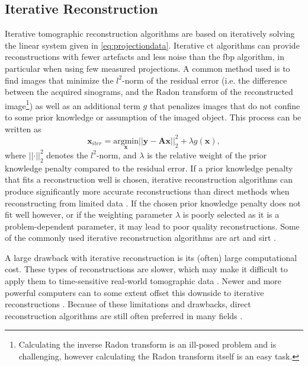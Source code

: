 \subsection{Iterative Reconstruction}
\label{sec:ct:reconstruction:iterative}
Iterative tomographic reconstruction algorithms are based on iteratively solving the linear system given in \cref{eq:projectiondata}. Iterative \gls{ct} algorithms can provide reconstructions with fewer artefacts and less noise than the \gls{fbp} algorithm, in particular when using few measured projections. A common method used is to find images that minimize the $l^2$-norm of the residual error (i.e. the difference between the acquired sinograms, and the Radon transform of the reconstructed image\footnote{Calculating the inverse Radon transform is an ill-posed problem and is challenging, however calculating the Radon transform itself is an easy task. }) as well as an additional term $g$ that penalizes images that do not confine to some prior knowledge or assumption of the imaged object. This process can be written as \cite{jimaging4110128}
\begin{equation}
    \label{eq:iterativesolution}
    \bm{x}_{iter} = \underset{\bm{x}}{\text{argmin}} \left|\left|\bm{y} - \bm{A}\bm{x}\right|\right|_2^2 + \lambda g(\bm{x}),
\end{equation}
where $\left|\left| \bm{\cdot} \right|\right|_2^2$ denotes the $l^2$-norm, and $\lambda$ is the relative weight of the prior knowledge penalty compared to the residual error. If a prior knowledge penalty that fits a reconstruction well is chosen, iterative reconstruction algorithms can produce significantly more accurate reconstructions than direct methods when reconstructing from limited data \cite{jimaging4110128}. If the chosen prior knowledge penalty does not fit well however, or if the weighting parameter $\lambda$ is poorly selected as it is a problem-dependent parameter, it may lead to poor quality reconstructions. Some of the commonly used iterative reconstruction algorithms are \gls{art} and \gls{sirt} \cite[283-284]{KakSlaney98}. 

A large drawback with iterative reconstruction is its (often) large computational cost. These types of reconstructions are slower, which may make it difficult to apply them to time-sensitive real-world tomographic data \cite{jimaging4110128}. Newer and more powerful computers can to some extent offset this downside to iterative reconstructions \cite{willemink2013iterative}. Because of these limitations and drawbacks, direct reconstruction algorithms are still often preferred in many fields \cite{Pan_2009}. 

